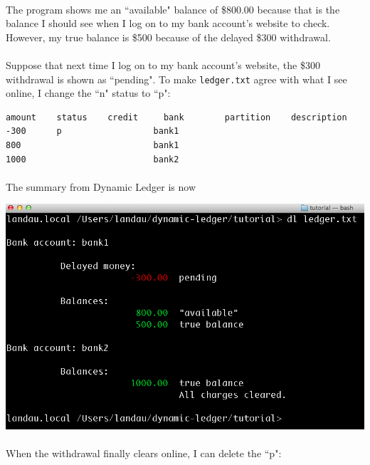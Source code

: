 \documentclass{article}
\begin{document}
\begin{flushleft}
\paragraph{} The program shows me an ``available" balance of \$800.00 because that is the balance I should see when I log on to my bank account's website to check. However, my true balance is \$500 because of the delayed \$300 withdrawal. 

\paragraph{} Suppose that next time I log on to my bank account's website, the \$300 withdrawal is shown as ``pending". To make {\tt ledger.txt} agree with what I see online, I change the ``n" status to ``p":

\begin{lstlisting}[title=ledger.txt]
amount    status	credit     bank        partition    description
-300      p                  bank1
800                          bank1
1000                         bank2
\end{lstlisting}

\paragraph{} The summary from Dynamic Ledger is now

\begin{center}
\includegraphics[scale=.45]{fig/sum1.png}
\end{center}  

\paragraph{} When the withdrawal finally clears online, I can delete the ``p":


\end{flushleft}
\end{document}
